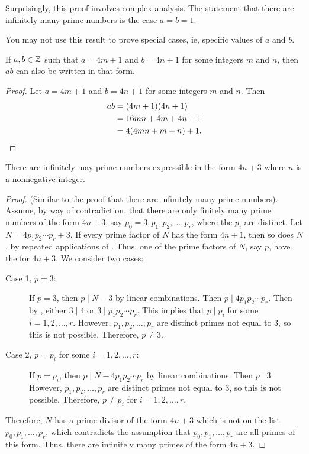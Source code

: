 \documentclass{ximera}
\begin{document}
\begin{remark}
    Surprisingly, this proof involves complex analysis. The statement that there are infinitely many prime numbers is the case $a=b=1$.
\end{remark}

\begin{warning}
    You may not use this result to prove special cases, ie, specific values of $a$ and $b$.
\end{warning}


\begin{lemma}\label{lem:prod-goodprimes}
 If $a,b\in\mathbb Z$ such that $a=4m+1$ and $b=4n+1$ for some integers $m$ and $n$, then $ab$ can also be written in that form.
\begin{proof}
 Let $a=4m+1$ and $b=4n+1$ for some integers $m$ and $n$. Then 
\begin{align*}
ab&=(4m+1)(4n+1)\\
&=16mn+4m+4n+1\\
&=4(4mn+m+n)+1.\qedhere
\end{align*}
\end{proof}
\end{lemma}

\begin{proposition}[Proposition 1.22]\label{prop:inf-badprimes}
 There are infinitely may prime numbers expressible in the form $4n+3$ where $n$ is a nonnegative integer.
\end{proposition}
\begin{proof}
 (Similar to the proof that there are infinitely many prime numbers). Assume, by way of contradiction, that there are only finitely many prime numbers of the form $4n+3$, say $p_0=3, p_1,p_2,\dots, p_r$, where the $p_i$ are distinct. Let $N=4p_1 p_2 \cdots p_r+3$. If every prime factor of $N$ has the form $4n+1$, then so does $N$, by repeated applications of . Thus, one of the prime factors of $N$, say $p$, have the for $4n+3$. We consider two cases:
 
\begin{description}
 \item[Case 1, $p=3$:] If $p=3$, then $p\mid N-3$ by linear combinations. Then $p\mid 4 p_1p_2\cdots p_r$. Then by , either $3\mid 4$ or $3\mid p_1p_2\cdots p_r$. This implies that $p\mid p_i$ for some $i=1,2,\dots,r$. However, $p_1,p_2,\dots,p_r$ are distinct primes not equal to $3$, so this is not possible. Therefore, $p\neq 3$.
 
 \item[Case 2, $p=p_i$ for some $i=1,2,\dots, r$:] If $p=p_i$, then $p\mid N-4p_1p_2\cdots p_r$ by linear combinations. Then $p\mid 3$. However, $p_1,p_2,\dots,p_r$ are distinct primes not equal to $3$, so this is not possible. Therefore, $p\neq p_i$ for $i=1,2,\dots,r$.
\end{description}
Therefore, $N$ has a prime divisor of the form $4n+3$ which is not on the list $p_0,p_1,\dots,p_r$, which contradicts the assumption that $p_0,p_1,\dots,p_r$ are all primes of this form. Thus, there are infinitely many primes of the form $4n+3$.
\end{proof}

\end{document}
